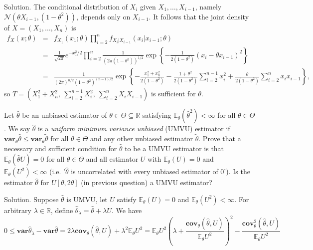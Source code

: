 Solution. The conditional distribution of $X_i$ given $X_1,\dots,X_{i-1}$, namely $\mathcal{N}\left(\theta X_{i-1},(1-\theta^2)\right)$, depends only on $X_{i-1}$. It follows that the joint density of $X=(X_1,\dots,X_n)$ is
\begin{eqnarray}
f_X(x;\theta) & = & f_{X_1}(x_1;\theta) \prod^n_{i=2}f_{X_i|X_{i-1}}(x_i|x_{i-1};\theta) \nonumber\\
& = & \frac{1}{\sqrt{2\pi}}e^{-x_1^2/2} \prod^n_{i=2}\frac{1}{\left(2\pi(1-\theta^2)\right)^{1/2}}\exp\left\{-\frac{1}{2\left(1-\theta^2\right)}(x_i-\theta x_{i-1})^2\right\}\nonumber\\
& = & \frac{1}{(2\pi)^{n/2}\left(1-\theta^2\right)^{(n-1)/2}} \exp\left\{-\frac{x_1^2+x_n^2}{2\left(1-\theta^2\right)} -\frac{1+\theta^2}{2\left(1-\theta^2\right)}\sum^{n-1}_{i=2}x_i^2 + \frac{\theta}{2\left(1-\theta^2\right)}\sum^n_{i=2}x_ix_{i-1}\right\},
\end{eqnarray}
so $T = \left(X_1^2+X_n^2,\ \sum^{n-1}_{i=2}X_i^2,\ \sum^n_{i=2}X_iX_{i-1}\right)$ is sufficient for $\theta$.





\item Let $\hat{\theta}$ be an unbiased estimator of $\theta\in\Theta\subseteq \mathbb{R}$ satisfying $\mathbb{E}_\theta(\hat{\theta}^2)<\infty$ for all $\theta\in\Theta$. We say $\hat{\theta}$ is a \emph{uniform minimum variance unbiased} (UMVU) estimator if $\mathbf{var}_\theta\hat{\theta}\leq \mathbf{var}_\theta\tilde{\theta}$ for all $\theta\in\Theta$ and any other unbiased estimator $\tilde{\theta}$. Prove that a necessary and sufficient condition for $\hat{\theta}$ to be a UMVU estimator is that $\mathbb{E}_\theta(\hat{\theta}U)=0$ for all $\theta\in\Theta$ and all estimator $U$ with $\mathbb{E}_\theta(U)=0$ and $\mathbb{E}_\theta(U^2)<\infty$ (i.e. '$\hat{\theta}$ is uncorrelated with every unbiased estimator of 0'). Is the estimator $\hat{\theta}$ for $U[\theta,2\theta]$ (in previous question) a UMVU estimator?



Solution. Suppose $\hat{\theta}$ is UMVU, let $U$ satisfy $\mathbb{E}_\theta(U)=0$ and $\mathbb{E}_\theta(U^2)<\infty$. For arbitrary $\lambda\in\mathbb{R}$, define $\hat{\theta}_{\lambda}=\hat{\theta}+\lambda U$. We have
\begin{equation}
0\leq \mathbf{var}\hat{\theta}_{\lambda} - \mathbf{var}\hat{\theta}= 2\lambda\mathbf{cov}_\theta\left(\hat{\theta},U \right)+\lambda^2\mathbb{E}_\theta U^2 = \mathbb{E}_\theta U^2\left(\lambda + \frac{\mathbf{cov}_\theta\left(\hat{\theta},U \right)}{\mathbb{E}_\theta U^2}\right)^2 - \frac{\mathbf{cov}^2_\theta\left(\hat{\theta},U \right)}{\mathbb{E}_\theta U^2}
\end{equation}

